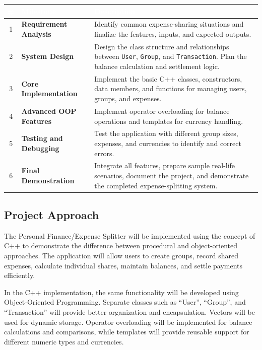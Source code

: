 \documentclass[11pt,a4paper]{article}
\begin{document}
\begin{center}
\renewcommand{\arraystretch}{1.4}
\begin{tabularx}{\linewidth}{|c|>{\bfseries}l|X|}
\hline
\rowcolor{tableblue}
\textcolor{white}{\#} & \textcolor{white}{Milestone} & \textcolor{white}{Description} \\
\hline
1 & Requirement Analysis & Identify common expense-sharing situations and finalize the features, inputs, and expected outputs. \\
\hline
2 & System Design & Design the class structure and relationships between \texttt{User}, \texttt{Group}, and \texttt{Transaction}. Plan the balance calculation and settlement logic. \\
\hline
3 & Core Implementation & Implement the basic C++ classes, constructors, data members, and functions for managing users, groups, and expenses. \\
\hline
4 & Advanced OOP Features & Implement operator overloading for balance operations and templates for currency handling. \\
\hline
5 & Testing and Debugging & Test the application with different group sizes, expenses, and currencies to identify and correct errors. \\
\hline
6 & Final Demonstration & Integrate all features, prepare sample real-life scenarios, document the project, and demonstrate the completed expense-splitting system. \\
\hline
\end{tabularx}
\end{center}

\subsection*{Project Approach}

The Personal Finance/Expense Splitter will be implemented using the concept of C++ to demonstrate the difference between procedural and object-oriented approaches. The application will allow users to create groups, record shared expenses, calculate individual shares, maintain balances, and settle payments efficiently.

In the C++ implementation, the same functionality will be developed using Object-Oriented Programming. Separate classes such as ``User'', ``Group'', and ``Transaction'' will provide better organization and encapsulation. Vectors will be used for dynamic storage. Operator overloading will be implemented for balance calculations and comparisons, while templates will provide reusable support for different numeric types and currencies.
\end{document}
